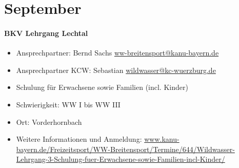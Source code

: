 \documentclass[12pt, a4paper]{report}
\begin{document}
\section*{September}\paragraph{BKV Lehrgang Lechtal}
\begin{itemize}
    \item Ansprechpartner: Bernd Sachs \href{mailto:ww-breitensport@kanu-bayern.de}{ww-breitensport@kanu-bayern.de}
    \item Ansprechpartner KCW: Sebastian \href{mailto:wildwasser@kc-wuerzburg.de}{wildwasser@kc-wuerzburg.de}
    \item Schulung für Erwachsene sowie Familien (incl. Kinder)
    \item Schwierigkeit: WW I bis WW III
    \item Ort: Vorderhornbach
    \item Weitere Informationen und Anmeldung: \url{www.kanu-bayern.de/Freizeitsport/WW-Breitensport/Termine/644/Wildwasser-Lehrgang-3-Schulung-fuer-Erwachsene-sowie-Familien-incl-Kinder/}
\end{itemize}
\end{document}
